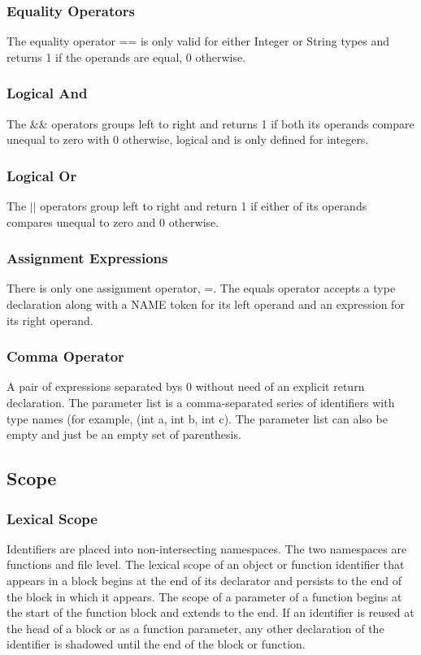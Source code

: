\documentclass[12pt]{article}
\begin{document}
\subsubsection{Equality Operators}
The equality operator == is only valid for either Integer or String types and returns 1 if the operands are equal, 0 otherwise. 

\subsubsection{Logical And}
The \&\& operators groups left to right and returns 1 if both its operands
compare unequal to zero with 0 otherwise, logical and is only defined for integers.

\subsubsection{Logical Or}
The $\vert \vert$ operators group left to right and return 1 if either of its operands compares unequal to zero and 0 otherwise.

\subsubsection{Assignment Expressions}
There is only one assignment operator, =.  The equals operator accepts a type declaration along with a NAME token for its left operand and an expression for its right operand. 
 
\subsubsection{Comma Operator}
A pair of expressions separated bys 0 without need of an explicit return declaration. 
The parameter list is a comma-separated series of identifiers with type names (for example, (int a, int b, int c).  The parameter list can also be empty and just be an empty set of parenthesis. 

\subsection{Scope}

\subsubsection{Lexical Scope}
Identifiers are placed into non-intersecting namespaces.  The two namespaces are functions and file level.  The lexical scope of an object or function identifier that appears in a block begins at the end of its declarator and persists to the end of the block in which it appears.  The scope of a parameter of a function begins at the start of the function block and extends to the end.  If an identifier is reused at the head of a block or as a function parameter, any other declaration of the identifier is shadowed until the end of the block or function. 
\end{document}
